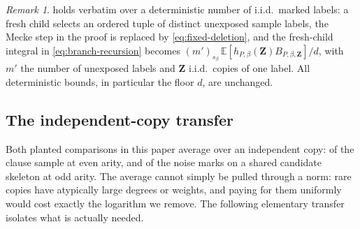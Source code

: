 \documentclass[11pt]{article}
\theoremstyle{definition}
\theoremstyle{remark}
\newtheorem{remark}[remark]{Remark}
\newcommand{\E}{\mathbb E}
\newcommand{\1}{\mathbf 1}
\numberwithin{equation}{section}
\begin{document}
\begin{remark}\label{rem:fixed-recursion}
 holds verbatim over a deterministic number
of i.i.d.\ marked labels: a fresh child selects an ordered tuple of
distinct unexposed sample labels, the Mecke step in the proof is
replaced by \cref{eq:fixed-deletion}, and the fresh-child integral in
\cref{eq:branch-recursion} becomes
$(m')_{s_\beta}\,\E[h_{P,\beta}(\mathbf Z)B_{P,\beta,\mathbf Z}]/d$,
with $m'$ the number of unexposed labels and $\mathbf Z$ i.i.d.\ copies
of one label.  All deterministic bounds, in
particular the floor $d$, are unchanged.
\end{remark}

\subsection{The independent-copy transfer}\label{sec:copy}

Both planted comparisons in this paper average over an independent
copy: of the clause sample at even arity, and of the noise marks on a
shared candidate skeleton at odd arity.  The average cannot simply be
pulled through a norm: rare copies have atypically large degrees or
weights, and paying for them uniformly would cost exactly the logarithm
we remove.  The following elementary transfer isolates what is actually
needed.
\end{document}
